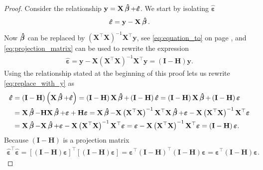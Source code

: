 \begin{proof}
    Consider the relationship $\mathbf{y} = \mathbf{X}\operatorname{\boldsymbol{\hat{\beta}}} + \boldsymbol{\hat{\varepsilon}}$.
    We start by isolating $\boldsymbol{\hat{\varepsilon}}$
    \begin{align*}
        \boldsymbol{\hat{\varepsilon}} = \mathbf{y} - \mathbf{X}\operatorname{\boldsymbol{\hat{\beta}}}.
    \end{align*}
    Now $\operatorname{\boldsymbol{\hat{\beta}}}$ can be replaced by $\left(\mathbf{X}^\top\mathbf{X}\right)^{-1}\mathbf{X}^\top\mathbf{y}$, see \eqref{eq:equation_to} on page \pageref{eq:equation_to}, and \eqref{eq:projection_matrix} can be used to rewrite the expression 
    \begin{align}
        \hat{\boldsymbol{\varepsilon}} = \mathbf{y} - \mathbf{X}\left(\mathbf{X}^\top\mathbf{X}\right)^{-1}\mathbf{X}^\top\mathbf{y}
        = \left(\mathbf{I} - \mathbf{H}\right)\mathbf{y}. \label{eq:replace_with_y}
    \end{align}
    Using the relationship stated at the beginning of this proof lets us rewrite \eqref{eq:replace_with_y} as
    \begin{align*}
        \boldsymbol{\hat{\varepsilon}} &= \left(\mathbf{I} - \mathbf{H}\right)\left(\mathbf{X}\operatorname{\boldsymbol{\hat{\beta}}} + \boldsymbol{\hat{\varepsilon}}\right) 
        = \left(\mathbf{I} - \mathbf{H}\right)\mathbf{X}\operatorname{\boldsymbol{\hat{\beta}}} + \left(\mathbf{I} - \mathbf{H}\right)\boldsymbol{\hat{\varepsilon}}
        = \left(\mathbf{I} - \mathbf{H}\right)\mathbf{X}\operatorname{\boldsymbol{\hat{\beta}}} + \left(\mathbf{I} - \mathbf{H}\right)\boldsymbol{\varepsilon}\\
        &= \mathbf{X}\operatorname{\boldsymbol{\hat{\beta}}} - \mathbf{H}\mathbf{X}\operatorname{\boldsymbol{\hat{\beta}}} + \boldsymbol{\varepsilon} + \mathbf{H}\boldsymbol{\varepsilon}
        = \mathbf{X}\operatorname{\boldsymbol{\hat{\beta}}} - \mathbf{X}\left(\mathbf{X}^\top\mathbf{X}\right)^{-1}\mathbf{X}^\top\mathbf{X}\operatorname{\boldsymbol{\hat{\beta}}} + \boldsymbol{\varepsilon} - \mathbf{X}\left(\mathbf{X}^\top\mathbf{X}\right)^{-1}\mathbf{X}^\top\boldsymbol{\varepsilon} \\
        &= \mathbf{X}\operatorname{\boldsymbol{\hat{\beta}}} - \mathbf{X}\operatorname{\boldsymbol{\hat{\beta}}} + \boldsymbol{\varepsilon} - \mathbf{X}\left(\mathbf{X}^\top\mathbf{X}\right)^{-1}\mathbf{X}^\top\boldsymbol{\varepsilon} 
        = \boldsymbol{\varepsilon} - \mathbf{X}\left(\mathbf{X}^\top\mathbf{X}\right)^{-1}\mathbf{X}^\top\boldsymbol{\varepsilon} = \left(\mathbf{I} - \mathbf{H}\right)\boldsymbol{\varepsilon}.
    \end{align*}
    Because $\left(\mathbf{I} - \mathbf{H}\right)$ is a projection matrix
    \begin{align*}
        \boldsymbol{\hat{\varepsilon}}^\top\boldsymbol{\hat{\varepsilon}} = \left[  \left(\mathbf{I} - \mathbf{H}\right)\boldsymbol{\varepsilon} \right]^\top\left[ \left(\mathbf{I} - \mathbf{H}\right)\boldsymbol{\varepsilon} \right] = \boldsymbol{\varepsilon}^\top\left(\mathbf{I} - \mathbf{H}\right)^\top \left(\mathbf{I} - \mathbf{H}\right)\boldsymbol{\varepsilon} = \boldsymbol{\varepsilon}^\top \left(\mathbf{I} - \mathbf{H}\right)\boldsymbol{\varepsilon}.

\end{align*}
\end{proof}
